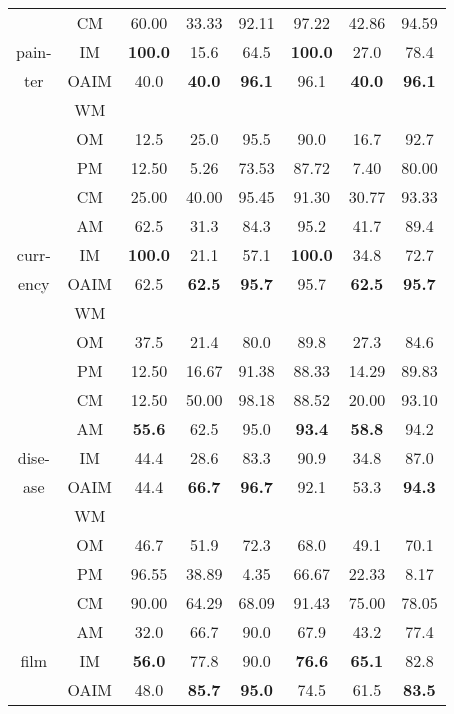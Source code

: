 {{{\begin{tabular}{|c|c|c|c|c|c|c|c|}
        &CM &60.00	&33.33	&92.11	&97.22	&42.86	&94.59\\\cline{2-8}
pain-   &IM &\textbf{100.0} &15.6   &64.5   &\textbf{100.0} &27.0   &78.4\\\cline{2-8}
ter  &OAIM  &40.0   &\textbf{40.0}  &\textbf{96.1}  &96.1   &\textbf{40.0}  &\textbf{96.1}\\\hline
&WM \\\cline{2-8}
     &OM    &12.5  &25.0  &95.5  &90.0  &16.7  &92.7\\\cline{2-8}
     &PM &12.50	&5.26	&73.53	&87.72	&7.40	&80.00\\\cline{2-8}
        &CM &25.00	&40.00	&95.45	&91.30	&30.77	&93.33\\\cline{2-8}
     &AM    &62.5   &31.3   &84.3   &95.2   &41.7   &89.4\\\cline{2-8}
curr-&IM    &\textbf{100.0} &21.1   &57.1   &\textbf{100.0} &34.8   &72.7\\\cline{2-8}
ency    &OAIM   &62.5   &\textbf{62.5}  &\textbf{95.7}  &95.7   &\textbf{62.5}  &\textbf{95.7}\\\hline
&WM \\\cline{2-8}
     &OM    &37.5  &21.4  &80.0  &89.8  &27.3  &84.6\\\cline{2-8}
     &PM &12.50	&16.67	&91.38	&88.33	&14.29	&89.83\\\cline{2-8}
        &CM &12.50	&50.00	&98.18	&88.52	&20.00	&93.10\\\cline{2-8}
     &AM    &\textbf{55.6}  &62.5   &95.0   &\textbf{93.4}  &\textbf{58.8}  &94.2\\\cline{2-8}
dise-   &IM &44.4   &28.6   &83.3   &90.9   &34.8   &87.0\\\cline{2-8}
ase &OAIM   &44.4   &\textbf{66.7}  &\textbf{96.7}  &92.1   &53.3   &\textbf{94.3}\\\hline
&WM \\\cline{2-8}
     &OM    &46.7  &51.9  &72.3  &68.0  &49.1  &70.1\\\cline{2-8}
     &PM &96.55	&38.89	&4.35	&66.67	&22.33	&8.17\\\cline{2-8}
     &CM &90.00	&64.29	&68.09	&91.43	&75.00	&78.05\\\cline{2-8}
     &AM    &32.0   &66.7   &90.0   &67.9   &43.2   &77.4\\\cline{2-8}
film    &IM &\textbf{56.0}  &77.8   &90.0   &\textbf{76.6}  &\textbf{65.1}  &82.8\\\cline{2-8}
    &OAIM   &48.0   &\textbf{85.7}  &\textbf{95.0}  &74.5   &61.5   &\textbf{83.5}\\\hline

\end{tabular}}}}
